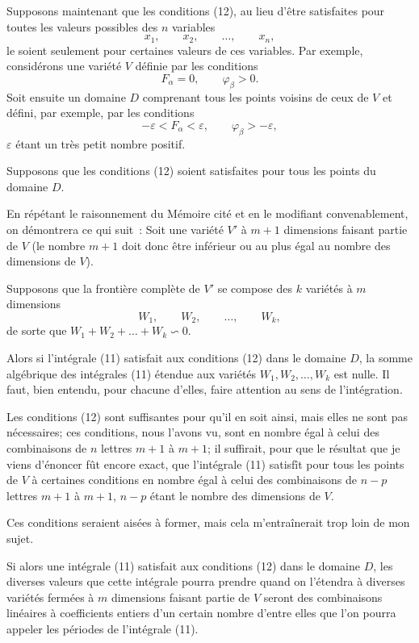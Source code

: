 \documentclass{article}
\begin{document}
Supposons maintenant que les conditions (12), au lieu d'être satisfaites pour toutes les valeurs possibles des $n$ variables
\[
x_{1}, \qquad x_{2}, \qquad \ldots, \qquad x_{n},
\]
le soient seulement pour certaines valeurs de ces variables. Par exemple, considérons une variété $V$ définie par les conditions
\[
F_{\alpha} = 0, \qquad \varphi_{\beta} > 0.
\]
Soit ensuite un domaine $D$ comprenant tous les points voisins de ceux de $V$ et défini, par exemple, par les conditions
\[
-\varepsilon < F_{\alpha} < \varepsilon, \qquad \varphi_{\beta} > -\varepsilon,
\]
$\varepsilon$ étant un très petit nombre positif.

Supposons que les conditions (12) soient satisfaites pour tous les points du domaine $D$.

En répétant le raisonnement du Mémoire cité et en le modifiant convenablement, on démontrera ce qui suit~: Soit une variété $V'$ à $m + 1$ dimensions faisant partie de $V$ (le nombre $m + 1$ doit donc être inférieur ou au plus égal au nombre des dimensions de $V$).

Supposons que la frontière complète de $V'$ se compose des $k$ variétés à $m$ dimensions
\[
W_{1}, \qquad W_{2}, \qquad \ldots, \qquad W_{k},
\]
de sorte que $W_{1} + W_{2} + \ldots + W_{k} \backsim 0$.

Alors si l'intégrale (11) satisfait aux conditions (12) dans le domaine $D$, la somme algébrique des intégrales (11) étendue aux variétés $W_{1}, W_{2}, \ldots, W_{k}$ est nulle. Il faut, bien entendu, pour chacune d'elles, faire attention au sens de l'intégration.

Les conditions (12) sont suffisantes pour qu'il en soit ainsi, mais elles ne sont pas nécessaires; ces conditions, nous l'avons vu, sont en nombre égal à celui des combinaisons de $n$ lettres $m + 1$ à $m + 1$; il suffirait, pour que le résultat que je viens d'énoncer fût encore exact, que l'intégrale (11) satisfît pour tous les points de $V$ à certaines conditions en nombre égal à celui des combinaisons de $n - p$ lettres $m + 1$ à $m + 1$, $n - p$ étant le nombre des dimensions de $V$.

Ces conditions seraient aisées à former, mais cela m'entraînerait trop loin de mon sujet.

Si alors une intégrale (11) satisfait aux conditions (12) dans le domaine $D$, les diverses valeurs que cette intégrale pourra prendre quand on l'étendra à diverses variétés fermées à $m$ dimensions faisant partie de $V$ seront des combinaisons linéaires à coefficients entiers d'un certain nombre d'entre elles que l'on pourra appeler les périodes de l'intégrale (11).
\end{document}
